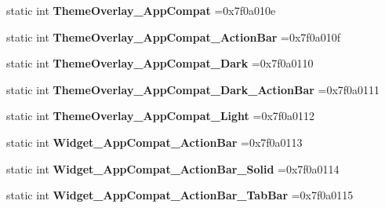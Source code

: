 \begin{DoxyCompactItemize}
static int {\bfseries Theme\+Overlay\+\_\+\+App\+Compat} =0x7f0a010e
\item 
\mbox{\label{classandroid_1_1support_1_1v7_1_1cardview_1_1R_1_1style_ae456ac1c094cb05a5c01a3e0eb5f4835}} 
static int {\bfseries Theme\+Overlay\+\_\+\+App\+Compat\+\_\+\+Action\+Bar} =0x7f0a010f
\item 
\mbox{\label{classandroid_1_1support_1_1v7_1_1cardview_1_1R_1_1style_a3058f8cfc2941876754f06092c170d1e}} 
static int {\bfseries Theme\+Overlay\+\_\+\+App\+Compat\+\_\+\+Dark} =0x7f0a0110
\item 
\mbox{\label{classandroid_1_1support_1_1v7_1_1cardview_1_1R_1_1style_a3cf7a1f52a56e8fbc2810b2e767f940e}} 
static int {\bfseries Theme\+Overlay\+\_\+\+App\+Compat\+\_\+\+Dark\+\_\+\+Action\+Bar} =0x7f0a0111
\item 
\mbox{\label{classandroid_1_1support_1_1v7_1_1cardview_1_1R_1_1style_a525694266154daa1531558ce12138061}} 
static int {\bfseries Theme\+Overlay\+\_\+\+App\+Compat\+\_\+\+Light} =0x7f0a0112
\item 
\mbox{\label{classandroid_1_1support_1_1v7_1_1cardview_1_1R_1_1style_a71a62a58a55ba9f8178f507806391341}} 
static int {\bfseries Widget\+\_\+\+App\+Compat\+\_\+\+Action\+Bar} =0x7f0a0113
\item 
\mbox{\label{classandroid_1_1support_1_1v7_1_1cardview_1_1R_1_1style_ac0f13215a2e4289db81ab478b6ffcfdb}} 
static int {\bfseries Widget\+\_\+\+App\+Compat\+\_\+\+Action\+Bar\+\_\+\+Solid} =0x7f0a0114
\item 
\mbox{\label{classandroid_1_1support_1_1v7_1_1cardview_1_1R_1_1style_acc784dabb6847f847903edf0da8c2b73}} 
static int {\bfseries Widget\+\_\+\+App\+Compat\+\_\+\+Action\+Bar\+\_\+\+Tab\+Bar} =0x7f0a0115
\item 
\mbox{\label{classandroid_1_1support_1_1v7_1_1cardview_1_1R_1_1style_add0ab52e8108215a0083c889c01a2c0f}} 

\end{DoxyCompactItemize}
